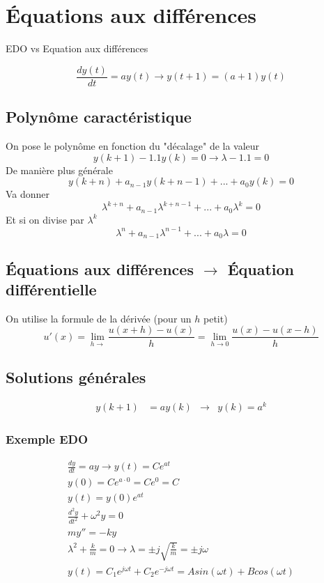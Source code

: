 \documentclass[resume]{subfiles}
\begin{document}
\section{Équations aux différences}

EDO vs Equation aux différences

$$\frac{dy(t)}{dt} = ay(t) \rightarrow y(t+1)=(a+1)y(t)$$


\subsection{Polynôme caractéristique}
On pose le polynôme en fonction du "décalage" de la valeur
$$y(k+1)-1.1y(k)=0\longrightarrow \lambda-1.1=0$$
De manière plus générale
$$y(k + n) + a_{n-1}y(k + n-1) +...+ a_0y(k) = 0$$
Va donner
$$\lambda^{k+n} + a_{n-1}\lambda^{k+n-1} + . . . + a_0\lambda^k = 0$$
Et si on divise par $\lambda^{k}$
$$\lambda^{n} + a_{n-1}\lambda^{n-1} + . . . + a_0\lambda = 0$$



\subsection{Équations aux différences $\longrightarrow$ Équation différentielle}
On utilise la formule de la dérivée (pour un $h$ petit)
$$u'(x)=\lim_{h\to }\frac{u(x+h)-u(x)}{h}=\lim_{h\to 0}\frac{u(x)-u(x-h)}{h}$$






\subsection{Solutions générales}
\begin{align*}
y(k+1)&= ay(k) & \longrightarrow & y(k)=a^{k}
\end{align*}





\subsubsection{Exemple EDO}
\begin{multline*}
\frac{dy}{dt} = ay \rightarrow y(t) = Ce^{at}\\
y(0) = Ce^{a\cdot 0} = Ce^0 = C\\
y(t) = y(0)e^{at}\\
\frac{d^2y}{dt^2} + \omega^2y = 0\\
my'' = -ky\\
\lambda^2 + \frac{k}{m}=0 \rightarrow \lambda = \pm j\sqrt{\frac{k}{m}}=\pm j\omega\\
y(t)=C_1 e^{j\omega t}+C_2 e^{-j\omega t} = Asin(\omega t)+Bcos(\omega t)
\end{multline*}
\end{document}
